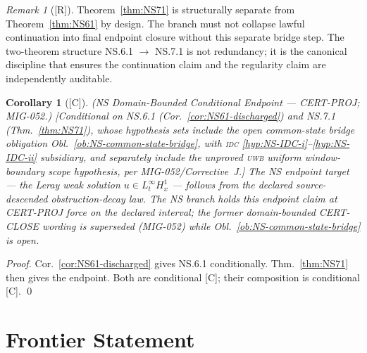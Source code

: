\documentclass[12pt,oneside]{amsbook}
\theoremstyle{plain}
\newtheorem{corollary}[theorem]{Corollary}
\theoremstyle{definition}
\theoremstyle{remark}
\newtheorem{remark}[theorem]{Remark}
\newcommand{\status}[1]{\textup{[#1]}}
\begin{document}
\begin{remark}[\status{R}]\label{rmk:NS71-separate}
Theorem~\ref{thm:NS71} is structurally separate from
Theorem~\ref{thm:NS61} by design. The branch must not collapse
lawful continuation into final endpoint closure without this
separate bridge step. The two-theorem structure
NS.6.1 $\to$ NS.7.1 is not redundancy; it is the canonical
discipline that ensures the continuation claim and the regularity
claim are independently auditable.
\end{remark}

\begin{corollary}[\status{C}]\label{cor:NS-both-give-endpoint}
\textup{(NS Domain-Bounded Conditional Endpoint --- CERT-PROJ;
MIG-052.)}
\textup{[Conditional on NS.6.1 (Cor.~\ref{cor:NS61-discharged})
and NS.7.1 (Thm.~\ref{thm:NS71}), whose hypothesis sets include the
open common-state bridge obligation
Obl.~\ref{ob:NS-common-state-bridge}, with \textsc{idc}
\eqref{hyp:NS-IDC-i}--\eqref{hyp:NS-IDC-ii} subsidiary, and
separately include the unproved \textsc{uwb} uniform
window-boundary scope hypothesis, per MIG-052/Corrective~J.]}
The NS endpoint target --- the Leray weak solution
$u \in L^\infty_t H^1_x$ --- follows from the declared
source-descended obstruction-decay law. The NS branch
holds this endpoint claim at CERT-PROJ force on the declared
interval; the former domain-bounded CERT-CLOSE wording is
superseded (MIG-052) while Obl.~\ref{ob:NS-common-state-bridge}
is open.
\end{corollary}

\begin{proof}
Cor.~\ref{cor:NS61-discharged} gives NS.6.1 conditionally.
Thm.~\ref{thm:NS71} then gives the endpoint.
Both are conditional [C]; their composition is conditional [C]. \qed
\end{proof}

\section{Frontier Statement}
\end{document}
